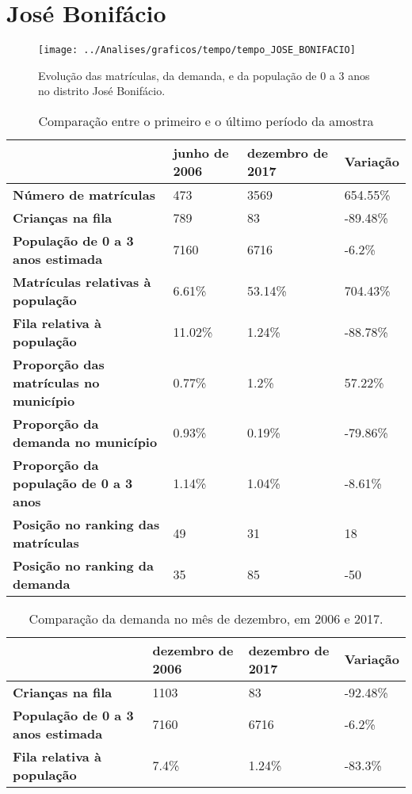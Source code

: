 \section{José Bonifácio}
\begin{figure}[H]
\centering
\texttt{[image: ../Analises/graficos/tempo/tempo\_JOSE\_BONIFACIO]}
\caption{Evolução das matrículas, da demanda, e da população de 0 a 3 anos no distrito José Bonifácio.}
\end{figure}
\begin{table}[H]
\begin{tabular}{|l|l|l|l|}
\hline
\textbf{}                                      & \textbf{junho de 2006}       & \textbf{dezembro de 2017}    & \textbf{Variação} \\ \hline
\textbf{Número de matrículas}                  & 473 & 3569 & 654.55\% \\ \hline
\textbf{Crianças na fila}                      & 789 & 83 & -89.48\% \\ \hline
\textbf{População de 0 a 3 anos estimada}      & 7160 & 6716 & -6.2\% \\ \hline
\textbf{Matrículas relativas à população}      & 6.61\% & 53.14\% & 704.43\% \\ \hline
\textbf{Fila relativa à população}             & 11.02\% & 1.24\% & -88.78\% \\ \hline
\textbf{Proporção das matrículas no município} & 0.77\% & 1.2\% & 57.22\% \\ \hline
\textbf{Proporção da demanda no município}     & 0.93\% & 0.19\% & -79.86\% \\ \hline
\textbf{Proporção da população de 0 a 3 anos}  & 1.14\% & 1.04\% & -8.61\% \\ \hline
\textbf{Posição no ranking das matrículas}     & 49 & 31 & 18 \\ \hline
\textbf{Posição no ranking da demanda}         & 35 & 85 & -50 \\ \hline
\end{tabular}
\caption{Comparação entre o primeiro e o último período da amostra}
\end{table}
\begin{table}[H]
\begin{tabular}{|l|l|l|l|}
\hline
\textbf{}                                 & \textbf{dezembro de 2006} & \textbf{dezembro de 2017} & \textbf{Variação} \\ \hline
\textbf{Crianças na fila}                      & 1103 & 83 & -92.48\% \\ \hline
\textbf{População de 0 a 3 anos estimada}      & 7160 & 6716 & -6.2\% \\ \hline
\textbf{Fila relativa à população}             & 7.4\% & 1.24\% & -83.3\% \\ \hline
\end{tabular}
\caption{Comparação da demanda no mês de dezembro, em 2006 e 2017.}
\end{table}
